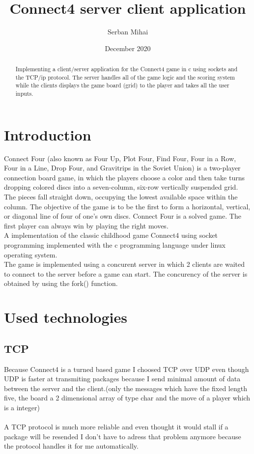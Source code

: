 \documentclass{article}
\title{Connect4 server client application}
\author{Serban Mihai}
\date{December 2020}
\begin{document}
\maketitle
\begin{abstract}
   Implementing a client/server application for the Connect4 game in c using sockets and the TCP/ip protocol. The server handles all of the game logic and the scoring system while the clients displays the game board (grid) to the player and takes all the user inputs.
\end{abstract}
\section{Introduction}
Connect Four (also known as Four Up, Plot Four, Find Four, Four in a Row, Four in a Line, Drop Four, and Gravitrips in the Soviet Union) is a two-player connection board game, in which the players choose a color and then take turns dropping colored discs into a seven-column, six-row vertically suspended grid. The pieces fall straight down, occupying the lowest available space within the column. The objective of the game is to be the first to form a horizontal, vertical, or diagonal line of four of one's own discs. Connect Four is a solved game. The first player can always win by playing the right moves. \\
A implementation of the classic childhood game Connect4 using socket programming implemented with the c programming language under linux operating system.\\
The game is implemented using a concurent server in which 2 clients are waited to connect to the server before a game can start. The concurency of the server is obtained by using the fork() function.

\section{Used technologies}
\subsection{TCP}
Because Connect4 is a turned based game I choosed TCP over UDP even though UDP is faster at transmiting packages because I send minimal amount of data between the server and the client.(only the messages which have the fixed length five, the board a 2 dimensional array of type char and the move of a player which is a integer)\\
\\A TCP protocol is much more reliable and even thought it would stall if a package will be resended I don't have to adress that problem anymore because the protocol handles it for me automatically.\\
\end{document}
